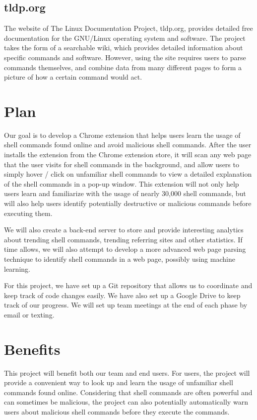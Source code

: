 \documentclass[11pt]{article}
\begin{document}
\subsection{tldp.org}

The website of The Linux Documentation Project, tldp.org, provides detailed free documentation for the GNU/Linux operating system and software. The project takes the form of a searchable wiki, which provides detailed information about specific commands and software. However, using the site requires users to parse commands themselves, and combine data from many different pages to form a picture of how a certain command would act.

\section{Plan}

Our goal is to develop a Chrome extension that helps users learn the usage of shell commands found online and avoid malicious shell commands. After the user installs the extension from the Chrome extension store, it will scan any web page that the user visits for shell commands in the background, and allow users to simply hover / click on unfamiliar shell commands to view a detailed explanation of the shell commands in a pop-up window. This extension will not only help users learn and familiarize with the usage of nearly 30,000 shell commands, but will also help users identify potentially destructive or malicious commands before executing them. 

We will also create a back-end server to store and provide interesting analytics about trending shell commands, trending referring sites and other statistics. If time allows, we will also attempt to develop a more advanced web page parsing technique to identify shell commands in a web page, possibly using machine learning.

For this project, we have set up a Git repository that allows us to coordinate and keep track of code changes easily. We have also set up a Google Drive to keep track of our progress. We will set up team meetings at the end of each phase by email or texting.

\section{Benefits}

This project will benefit both our team and end users. For users, the project will provide a convenient way to look up and learn the usage of unfamiliar shell commands found online. Considering that shell commands are often powerful and can sometimes be malicious, the project can also potentially automatically warn users about malicious shell commands before they execute the commands. 
\end{document}
